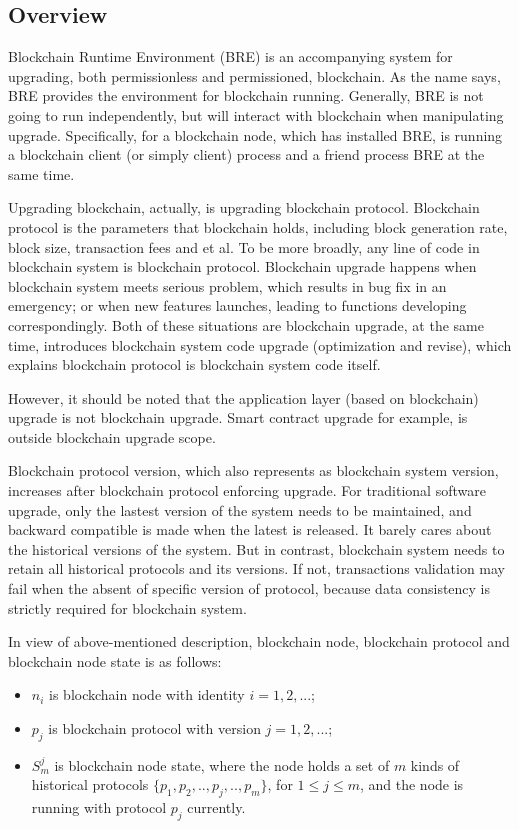 \documentclass[sigplan,screen]{acmart}
\begin{document}
\subsection{Overview}
Blockchain Runtime Environment (BRE) is an accompanying system for upgrading,
both permissionless and permissioned, blockchain. As the name says, BRE
provides the environment for blockchain running. Generally, BRE is not going to
run independently, but will interact with blockchain when manipulating
upgrade. Specifically, for a blockchain node, which has installed BRE, is
running a blockchain client (or simply client) process and a friend process BRE
at the same time.

Upgrading blockchain, actually, is upgrading blockchain protocol.
Blockchain protocol is the parameters that blockchain holds, including block
generation rate, block size, transaction fees and et al. To be
more broadly, any line of code in blockchain system is blockchain protocol.
Blockchain upgrade happens when blockchain system meets serious problem,
which results in bug fix in an emergency; or when new features launches,
leading to functions developing correspondingly. Both of these situations
are blockchain upgrade, at the same time, introduces blockchain system code
upgrade (optimization and revise), which explains blockchain protocol is
blockchain system code itself.

However, it should be noted that the application layer (based on blockchain)
upgrade is not blockchain upgrade. Smart contract upgrade for
example, is outside blockchain upgrade scope.

Blockchain protocol version, which also represents as blockchain system
version, increases after blockchain protocol enforcing upgrade. For traditional
software upgrade, only the lastest version of the system needs to be
maintained, and backward compatible is made when the latest is
released. It barely cares about the historical versions of the system. But in
contrast, blockchain system needs to retain all historical protocols and its
versions. If not, transactions validation may fail when the absent of specific
version of protocol, because data consistency is strictly required for
blockchain system.

In view of above-mentioned description, blockchain node, blockchain protocol
and blockchain node state is as follows:
\begin{itemize}
  \item $n_i$ is blockchain node with identity $i=1,2,...$;
  \item $p_j$ is blockchain protocol with version $j=1,2,...$;
  \item $S_{m}^{j}$ is blockchain node state, where the node holds a set of $m$
    kinds of historical protocols $\{p_1,p_2,..,p_j,..,p_m\}$, for
    $1{\leq}j{\leq}m$, and the node is running with protocol $p_j$ currently.
\end{itemize}
\end{document}
